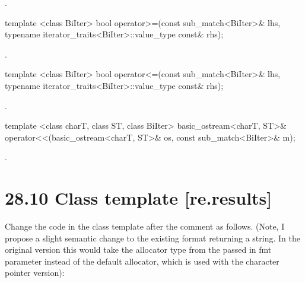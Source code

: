 \documentclass[ebook,11pt,article]{memoir}
\begin{document}
\begin{itemdescr}
\pnum
\returns {}.
\end{itemdescr}

\begin{itemdecl}
template <class BiIter> 
  bool operator>=(const sub_match<BiIter>& lhs, 
                  typename iterator_traits<BiIter>::value_type const& rhs); 
\end{itemdecl}

\begin{itemdescr}
\pnum
\returns {}.
\end{itemdescr}

\begin{itemdecl}
template <class BiIter> 
  bool operator<=(const sub_match<BiIter>& lhs, 
                  typename iterator_traits<BiIter>::value_type const& rhs); 
\end{itemdecl}

\begin{itemdescr}
\pnum
\returns {}.
\end{itemdescr}

\begin{itemdecl}
template <class charT, class ST, class BiIter>
  basic_ostream<charT, ST>&
  operator<<(basic_ostream<charT, ST>& os, const sub_match<BiIter>& m); 
\end{itemdecl}

\begin{itemdescr}
\pnum\returns  {}.
\end{itemdescr}

\section{28.10 Class template  [re.results]}
Change the code in the class template after the comment  as follows. (Note, I propose a slight semantic change to the existing format returning a string. In the original version this would take the allocator type from the passed in fmt parameter instead of the default allocator, which is used with the character pointer version):
\end{document}
